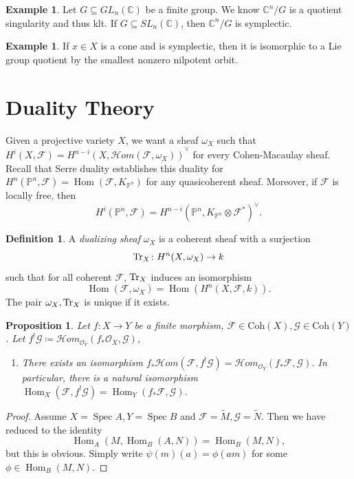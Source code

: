 \documentclass[leqno, openany]{memoir}
\newtheorem{prop}[thm]{Proposition}
\theoremstyle{definition}
\newtheorem{defn}[thm]{Definition}
\newtheorem{exm}[thm]{Example}
\theoremstyle{remark}
\theoremstyle{plain}
\theoremstyle{definition}
\theoremstyle{remark}
\newcommand{\C}{\mathbb{C}}
\renewcommand{\P}{\mathbb{P}}
\newcommand{\mc}[1]{\mathcal{#1}}
\newcommand{\mr}[1]{\mathrm{#1}}
\newcommand{\wt}[1]{\widetilde{#1}}
\DeclareMathOperator{\Hom}{Hom}
\DeclareMathOperator{\Spec}{Spec}
\begin{document}
\begin{exm}
    Let $G \subseteq GL_n(\C)$ be a finite group. We know $\C^n/G$ is a quotient singularity and thus klt. If $G \subseteq SL_n(\C)$, then $\C^n/G$ is symplectic.
\end{exm}

\begin{exm}
    If $x \in X$ is a cone and is symplectic, then it is isomorphic to a Lie group quotient by the smallest nonzero nilpotent orbit.
\end{exm}

\section{Duality Theory}%
\label{sec:duality_theory}

Given a projective variety $X$, we want a sheaf $\omega_X$ such that $H^i(X, \mc{F}) = { H^{n-i}(X, \mc{H}om(\mc{F}, \omega_X)) }^{\vee}$ for every Cohen-Macaulay sheaf. Recall that Serre duality establishes this duality for $H^n(\P^n, \mc{F}) = \Hom(\mc{F}, K_{\P^n})$ for any quasicoherent sheaf. Moreover, if $\mc{F}$ is locally free, then
\[ H^i(\P^n, \mc{F}) = { H^{n-i}(\P^n, K_{\P^n} \otimes \mc{F}^*) }^{\vee}. \]
\begin{defn}
    A \textit{dualizing sheaf} $\omega_X$ is a coherent sheaf with a surjection
    \[ \Tr_X \colon H^n(X, \omega_X) \to k \]
    such that for all coherent $\mc{F}$, $\Tr_X$ induces an isomorphism
    \[ \Hom (\mc{F}, \omega_X) = \Hom(H^n(X, \mc{F}, k)). \]
    The pair $\omega_X, \Tr_X$ is unique if it exists.
\end{defn}

\begin{prop}
    Let $f \colon X \to Y$ be a finite morphism, $\mc{F} \in \mr{Coh}(X), \mc{G} \in \mr{Coh}(Y)$. Let $f^! \mc{G} \coloneqq \mc{H}om_{\mc{O}_Y}(f_* \mc{O}_X, \mc{G})$,
    \begin{enumerate}
        \item There exists an isomorphism $f_* \mc{H}om(\mc{F}, f^! \mc{G}) = \mc{H}om_{\mc{O}_Y}(f_* \mc{F}, \mc{G})$.
        In particular, there is a natural isomorphism $\Hom_X(\mc{F}, f^! \mc{G}) = \Hom_Y(f_* \mc{F}, \mc{G})$.
    \end{enumerate}
\end{prop}

\begin{proof}
    Assume $X = \Spec A, Y = \Spec B$ and $\mc{F} = \wt{M}, \mc{G} = \wt{N}$. Then we have reduced to the identity
    \[ \Hom_A(M, \Hom_B(A, N)) = \Hom_B(M, N), \]
    but this is obvious. Simply write $\psi(m)(a) = \phi(am)$ for some $\phi \in \Hom_B(M, N)$.
\end{proof}
\end{document}

